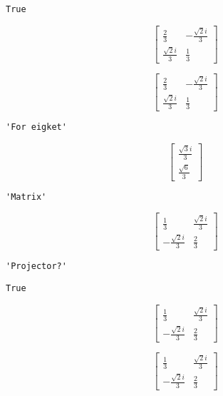 \documentclass[11pt]{article}
\begin{document}
    
    
    \begin{verbatim}
True
    \end{verbatim}

    
    $$\left[\begin{matrix}\frac{2}{3} & - \frac{\sqrt{2} i}{3}\\\frac{\sqrt{2} i}{3} & \frac{1}{3}\end{matrix}\right]$$

    
    $$\left[\begin{matrix}\frac{2}{3} & - \frac{\sqrt{2} i}{3}\\\frac{\sqrt{2} i}{3} & \frac{1}{3}\end{matrix}\right]$$

    
    
    \begin{verbatim}
'For eigket'
    \end{verbatim}

    
    $$\left[\begin{matrix}\frac{\sqrt{3} i}{3}\\\frac{\sqrt{6}}{3}\end{matrix}\right]$$

    
    
    \begin{verbatim}
'Matrix'
    \end{verbatim}

    
    $$\left[\begin{matrix}\frac{1}{3} & \frac{\sqrt{2} i}{3}\\- \frac{\sqrt{2} i}{3} & \frac{2}{3}\end{matrix}\right]$$

    
    
    \begin{verbatim}
'Projector?'
    \end{verbatim}

    
    
    \begin{verbatim}
True
    \end{verbatim}

    
    $$\left[\begin{matrix}\frac{1}{3} & \frac{\sqrt{2} i}{3}\\- \frac{\sqrt{2} i}{3} & \frac{2}{3}\end{matrix}\right]$$

    
    $$\left[\begin{matrix}\frac{1}{3} & \frac{\sqrt{2} i}{3}\\- \frac{\sqrt{2} i}{3} & \frac{2}{3}\end{matrix}\right]$$
\end{document}
